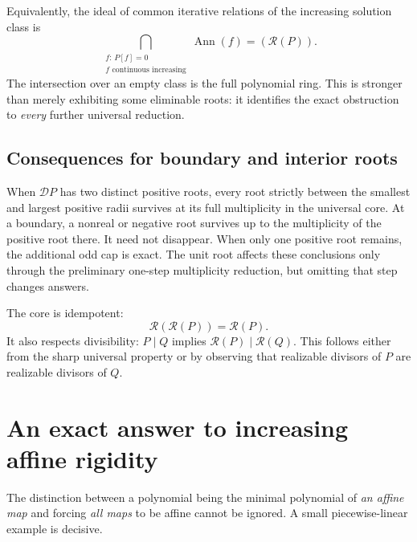 \documentclass[11pt,letterpaper]{article}
\theoremstyle{definition}
\theoremstyle{remark}
\newcommand{\Ann}{\operatorname{Ann}}
\newcommand{\scD}{\mathcal D}
\newcommand{\core}{\mathcal R}
\begin{document}
Equivalently, the ideal of common iterative relations of the increasing
solution class is
\begin{equation}
 \bigcap_{\substack{f:\,P[f]=0\\ f\text{ continuous increasing}}}\Ann(f)
       =(\core(P)).
 \label{nrr:sc:eq:commonideal}
\end{equation}
The intersection over an empty class is the full polynomial ring.
This is stronger than merely exhibiting some eliminable roots: it
identifies the exact obstruction to \emph{every} further universal reduction.

\subsection{Consequences for boundary and interior roots}

When $\scD P$ has two distinct positive roots, every root strictly between
the smallest and largest positive radii survives at its full multiplicity
in the universal core. At a boundary, a nonreal or negative root survives
up to the multiplicity of the positive root there. It need not disappear.
When only one positive root remains, the additional odd cap is exact.
The unit root affects these conclusions only through the preliminary
one-step multiplicity reduction, but omitting that step changes answers.

The core is idempotent:
\begin{equation}
 \core(\core(P))=\core(P).
 \label{nrr:sc:eq:idempotent}
\end{equation}
It also respects divisibility: $P\mid Q$ implies
$\core(P)\mid\core(Q)$. This follows either from the sharp universal
property or by observing that realizable divisors of $P$ are realizable
divisors of $Q$.

\section{An exact answer to increasing affine rigidity}
\label{nrr:sc:sec:rigidity}

The distinction between a polynomial being the minimal polynomial of
\emph{an affine map} and forcing \emph{all maps} to be affine cannot be
ignored. A small piecewise-linear example is decisive.
\end{document}
